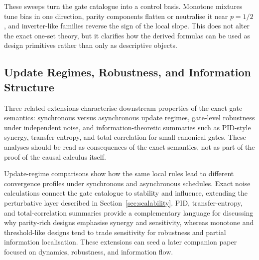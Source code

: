 \documentclass[11pt]{article}
\theoremstyle{definition}
\begin{document}
These sweeps turn the gate catalogue into a control basis. Monotone mixtures tune bias in one direction, parity components flatten or neutralise it near \(p=1/2\), and inverter-like families reverse the sign of the local slope. This does not alter the exact one-set theory, but it clarifies how the derived formulas can be used as design primitives rather than only as descriptive objects.

\subsection{Update Regimes, Robustness, and Information Structure}
Three related extensions characterise downstream properties of the exact gate semantics: synchronous versus asynchronous update regimes, gate-level robustness under independent noise, and information-theoretic summaries such as PID-style synergy, transfer entropy, and total correlation for small canonical gates. These analyses should be read as consequences of the exact semantics, not as part of the proof of the causal calculus itself.

Update-regime comparisons show how the same local rules lead to different convergence profiles under synchronous and asynchronous schedules. Exact noise calculations connect the gate catalogue to stability and influence, extending the perturbative layer described in Section~\ref{sec:scalability}. PID, transfer-entropy, and total-correlation summaries provide a complementary language for discussing why parity-rich designs emphasise synergy and sensitivity, whereas monotone and threshold-like designs tend to trade sensitivity for robustness and partial information localisation. These extensions can seed a later companion paper focused on dynamics, robustness, and information flow.



\end{document}
